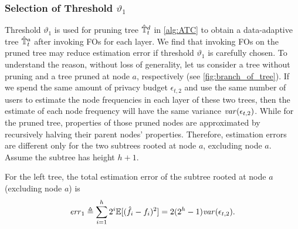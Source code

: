 \subsubsection{Selection of Threshold $\vartheta_1$}
Threshold $\vartheta_1$ is used for pruning tree $\hat{\mathbb{T}}^d_t$ in \cref{alg:ATC} to
obtain a data-adaptive tree $\hat{\mathbb{T}}^a_t$ after invoking FOs for each layer.
We find that invoking FOs on the pruned tree may reduce estimation error if
threshold $\vartheta_1$ is carefully chosen.
To understand the reason, without loss of generality, let us consider a tree
without pruning and a tree pruned at node $a$, respectively (see
\cref{fig:branch_of_tree}).
If we spend the same amount of privacy budget $\epsilon_{t,2}$ and use the same
number of users to estimate the node frequencies in each layer of these two
trees, then the estimate of each node frequency will have the same variance
$\mathit{var}(\epsilon_{t,2})$.
While for the pruned tree, properties of those pruned nodes are approximated by
recursively halving their parent nodes' properties.
Therefore, estimation errors are different only for the two subtrees rooted at
node $a$, excluding node $a$.
Assume the subtree has height $h+1$.

For the left tree, the total estimation error of the subtree rooted at node $a$
(excluding node $a$) is
\[
  \mathit{err}_1 \triangleq
  \sum_{i=1}^h 2^i\mathbb{E}[(\hat{f_i} - f_i)^2]
  = 2(2^h-1)\mathit{var}(\epsilon_{t,2}).
\]

